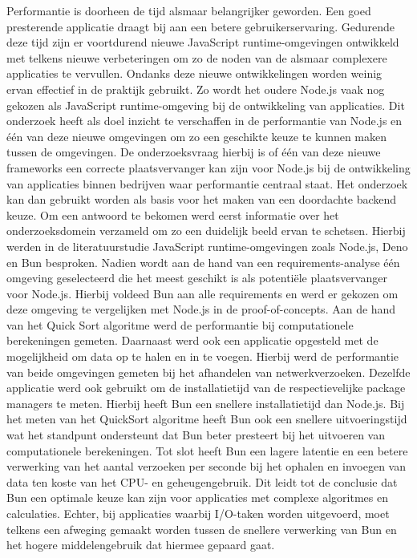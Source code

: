Performantie is doorheen de tijd alsmaar belangrijker geworden. 
Een goed presterende applicatie draagt bij aan een betere gebruikerservaring.
Gedurende deze tijd zijn er voortdurend nieuwe JavaScript runtime-omgevingen ontwikkeld met telkens nieuwe verbeteringen om
zo de noden van de alsmaar complexere applicaties te vervullen. 
Ondanks deze nieuwe ontwikkelingen worden weinig ervan effectief in de praktijk gebruikt.
Zo wordt het oudere Node.js vaak nog gekozen als JavaScript runtime-omgeving bij de ontwikkeling van applicaties.
Dit onderzoek heeft als doel inzicht te verschaffen in de performantie van Node.js en één van deze nieuwe omgevingen
om zo een geschikte keuze te kunnen maken tussen de omgevingen.
De onderzoeksvraag hierbij is of één van deze nieuwe frameworks  
een correcte plaatsvervanger kan zijn voor Node.js bij de ontwikkeling van applicaties binnen bedrijven 
waar performantie centraal staat. Het onderzoek kan dan gebruikt worden als basis 
voor het maken van een doordachte backend keuze.
Om een antwoord te bekomen werd eerst informatie over het onderzoeksdomein verzameld om zo een duidelijk beeld ervan te schetsen.
Hierbij werden in de literatuurstudie JavaScript runtime-omgevingen zoals Node.js, Deno en Bun besproken.
Nadien wordt aan de hand van een requirements-analyse één omgeving geselecteerd die het meest geschikt is als potentiële plaatsvervanger voor Node.js.
Hierbij voldeed Bun aan alle requirements en werd er gekozen om deze omgeving te vergelijken met Node.js in de proof-of-concepts.
Aan de hand van het Quick Sort algoritme werd de performantie bij computationele berekeningen gemeten.
Daarnaast werd ook een applicatie opgesteld met de mogelijkheid om data op te halen en in te voegen. 
Hierbij werd de performantie van beide omgevingen gemeten bij het afhandelen van netwerkverzoeken.
Dezelfde applicatie werd ook gebruikt om de installatietijd van de respectievelijke package managers te meten.
Hierbij heeft Bun een snellere installatietijd dan Node.js.
Bij het meten van het QuickSort algoritme heeft Bun ook een snellere uitvoeringstijd wat het standpunt 
ondersteunt dat Bun beter presteert bij het uitvoeren van computationele berekeningen.
Tot slot heeft Bun een lagere latentie en een betere verwerking van het aantal verzoeken per seconde bij het ophalen en
invoegen van data ten koste van het CPU- en geheugengebruik.
Dit leidt tot de conclusie dat Bun een optimale keuze kan zijn voor applicaties met complexe algoritmes en calculaties. Echter, 
bij applicaties waarbij I/O-taken worden uitgevoerd, moet telkens een afweging gemaakt worden tussen de snellere verwerking van Bun
en het hogere middelengebruik dat hiermee gepaard gaat.


